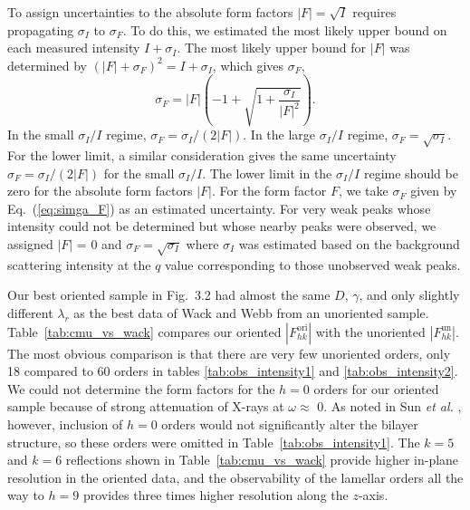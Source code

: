 To assign uncertainties to the absolute 
form factors $|F|=\sqrt{I}$ requires propagating $\sigma_I$ to $\sigma_F$.
To do this, we estimated the most likely upper bound on each measured intensity 
$I+\sigma_I$. The most likely upper bound for $|F|$ was determined by
$(|F|+\sigma_F)^2=I+\sigma_I$, which gives $\sigma_F$,
\begin{equation}
\label{eq:simga_F}
  \sigma_F=|F|\left(-1+\sqrt{1+\frac{\sigma_I}{|F|^2}}\right).
\end{equation}
In the small $\sigma_I/I$ regime, $\sigma_F=\sigma_I/(2|F|)$. In the 
large $\sigma_I/I$ regime, $\sigma_F=\sqrt{\sigma_I}$. For the lower limit,
a similar consideration gives the same uncertainty $\sigma_F=\sigma_I/(2|F|)$
for the small $\sigma_I/I$. The lower limit in the $\sigma_I/I$ regime
should be zero for the absolute form factors $|F|$. For the form factor $F$,
we take $\sigma_F$ given by Eq.~(\ref{eq:simga_F}) as an estimated 
uncertainty. For very weak peaks whose intensity could not be determined but
whose nearby peaks were observed, we assigned $|F|$ = 0 and 
$\sigma_F = \sqrt{\sigma_I}$ where $\sigma_I$ was estimated based on the
background scattering intensity at the $q$ value corresponding to those
unobserved weak peaks. 

Our best oriented sample in Fig.~3.2 had almost the same $D$, $\gamma$, and 
only slightly different ${\lambda}_r$ as the best data of Wack and Webb 
\cite{ref:Wack89} from an unoriented sample. 
Table~\ref{tab:cmu_vs_wack} compares our oriented 
$\left|F_{hk}^\text{ori}\right|$ with the unoriented 
$\left|F_{hk}^\text{un}\right|$. The most obvious comparison is that there 
are very few unoriented orders, only 18 compared to 60 orders in tables 
\ref{tab:obs_intensity1} and \ref{tab:obs_intensity2}.
We could not determine the form factors for the $h=0$ orders for our
oriented sample because of strong attenuation of X-rays 
at $\omega \approx$ 0\textdegree.
As noted in Sun \textit{et al.} \cite{ref:Sun96}, however,
inclusion of $h=0$ orders would not significantly alter the bilayer 
structure, so these orders were omitted in Table~\ref{tab:obs_intensity1}.
The $k=5$ and $k=6$ reflections shown in Table~\ref{tab:cmu_vs_wack} 
provide 
higher in-plane resolution in the oriented data, 
and the observability of the 
lamellar orders all the way to $h=9$ provides three times higher resolution 
along the $z$-axis.

